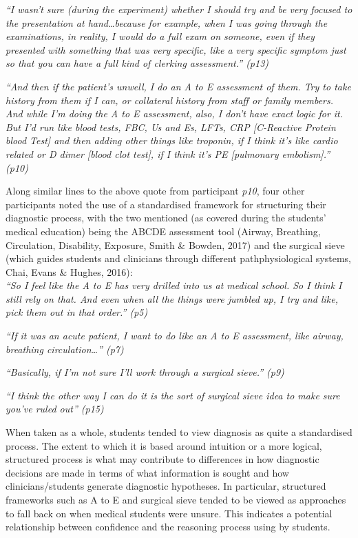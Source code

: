 \documentclass[a4paper, nobind]{templates/ociamthesis}
\begin{document}
\emph{``I wasn't sure (during the experiment) whether I should try and be very focused to the presentation at hand\ldots because for example, when I was going through the examinations, in reality, I would do a full exam on someone, even if they presented with something that was very specific, like a very specific symptom just so that you can have a full kind of clerking assessment.'' (p13)}

\emph{``And then if the patient's unwell, I do an A to E assessment of them. Try to take history from them if I can, or collateral history from staff or family members. And while I'm doing the A to E assessment, also, I don't have exact logic for it. But I'd run like blood tests, FBC, Us and Es, LFTs, CRP {[}C-Reactive Protein blood Test{]} and then adding other things like troponin, if I think it's like cardio related or D dimer {[}blood clot test{]}, if I think it's PE {[}pulmonary embolism{]}.'' (p10)}

Along similar lines to the above quote from participant \emph{p10}, four other participants noted the use of a standardised framework for structuring their diagnostic process, with the two mentioned (as covered during the students' medical education) being the ABCDE assessment tool (Airway, Breathing, Circulation, Disability, Exposure, Smith \& Bowden, 2017) and the surgical sieve (which guides students and clinicians through different pathphysiological systems, Chai, Evans \& Hughes, 2016):\\

\emph{``So I feel like the A to E has very drilled into us at medical school. So I think I still rely on that. And even when all the things were jumbled up, I try and like, pick them out in that order.'' (p5)}

\emph{``If it was an acute patient, I want to do like an A to E assessment, like airway, breathing circulation\ldots{}'' (p7)}

\emph{``Basically, if I'm not sure I'll work through a surgical sieve.'' (p9)}

\emph{``I think the other way I can do it is the sort of surgical sieve idea to make sure you've ruled out'' (p15)}

\hfill\break
When taken as a whole, students tended to view diagnosis as quite a standardised process. The extent to which it is based around intuition or a more logical, structured process is what may contribute to differences in how diagnostic decisions are made in terms of what information is sought and how clinicians/students generate diagnostic hypotheses. In particular, structured frameworks such as A to E and surgical sieve tended to be viewed as approaches to fall back on when medical students were unsure. This indicates a potential relationship between confidence and the reasoning process using by students.
\end{document}
